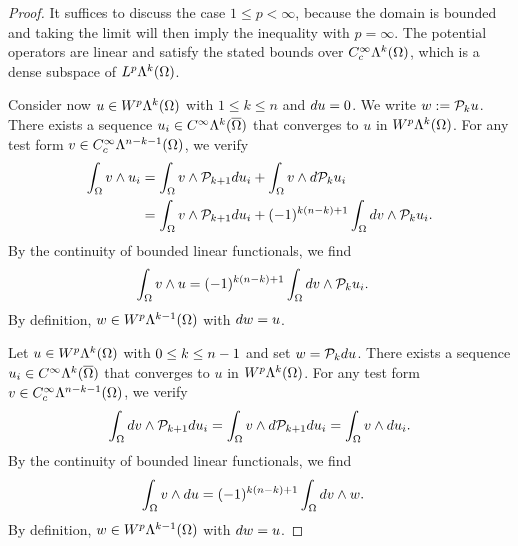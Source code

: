 \documentclass[10pt,a4paper]{article}
\begin{document}
\begin{proof}
    It suffices to discuss the case $1 \leq p < \infty$, because the domain is bounded 
    and taking the limit will then imply the inequality with $p = \infty$. 
    The potential operators are linear and satisfy the stated bounds over $C^{\infty}_{c}\Lambda^{k}(\Omega)$,
    which is a dense subspace of $L^{p}\Lambda^{k}(\Omega)$. 

    Consider now $u \in W^{p}\Lambda^{k}(\Omega)$ with $1 \leq k \leq n$ and $d u = 0$. 
    We write $w := {\mathcal P}_{k  } u$. 
    There exists a sequence $u_{i} \in C^{\infty}\Lambda^{k}(\overline\Omega)$ that converges to $u$ in $W^{p}\Lambda^{k}(\Omega)$. 
    For any test form $v \in C^{\infty}_{c}\Lambda^{n-k-1}(\Omega)$, we verify 
    \begin{align*}
        \int_{\Omega} v \wedge u_{i} 
        &=
        \int_{\Omega} v \wedge {\mathcal P}_{k+1} d u_{i}
        +
        \int_{\Omega} v \wedge d {\mathcal P}_{k  } u_{i}
        \\&=
        \int_{\Omega} v \wedge {\mathcal P}_{k+1} d u_{i}
        +
        (-1)^{k(n-k)+1}
        \int_{\Omega} d v \wedge {\mathcal P}_{k  } u_{i}
        .
    \end{align*}
    By the continuity of bounded linear functionals, we find 
    \begin{align*}
        \int_{\Omega} v \wedge u 
        &=
        (-1)^{k(n-k)+1}
        \int_{\Omega} d v \wedge {\mathcal P}_{k  } u_{i}
        .
    \end{align*}
    By definition, $w \in W^{p}\Lambda^{k-1}(\Omega)$ with $d w = u$.
    
    \color{blue}
    Let $u \in W^{p}_{ }\Lambda^{k}(\Omega)$ with $0 \leq k \leq n-1$ and set $w = {\mathcal P}_{k} d u$.
    There exists a sequence $u_{i} \in C^{\infty}\Lambda^{k}(\overline\Omega)$ that converges to $u$ in $W^{p}\Lambda^{k}(\Omega)$. 
    For any test form $v \in C^{\infty}_{c}\Lambda^{n-k-1}(\Omega)$, we verify 
    \begin{align*}
        \int_{\Omega} d v \wedge {\mathcal P}_{k+1} d u_{i}
        =
        \int_{\Omega} v \wedge d {\mathcal P}_{k+1} d u_{i}
        =
        \int_{\Omega} v \wedge d u_{i}
        .
    \end{align*}
    By the continuity of bounded linear functionals, we find 
    \begin{align*}
        \int_{\Omega} v \wedge d u 
        &=
        (-1)^{k(n-k)+1}
        \int_{\Omega} d v \wedge w
        .
    \end{align*}
    By definition, $w \in W^{p}\Lambda^{k-1}(\Omega)$ with $d w = u$.
    \color{black}
    

\end{proof}
\end{document}
